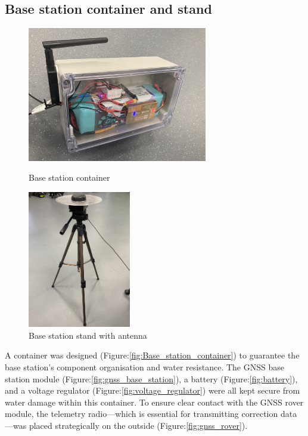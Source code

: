 \documentclass{report}
\begin{document}
\subsection{Base station container and stand}
\begin{figure}[H]
  \begin{minipage}{.5\textwidth}
    \centering
    \includegraphics[width=0.7\textwidth]{Pictures/base_station_box.png}
    \caption{Base station container}
    \label{fig:Base_station_container}
  \end{minipage}
  \begin{minipage}{.5\textwidth}
    \centering
    \includegraphics[width=0.4\textwidth]{Pictures/base_station_stand.jpg}
    \caption{Base station stand with antenna}
    \label{fig:Base_station_stand}
  \end{minipage}
\end{figure}
A container was designed (Figure:\ref{fig:Base_station_container}) to guarantee
the base station's component organisation and water resistance. The GNSS base
station module (Figure:\ref{fig:gnss_base_station}), a battery
(Figure:\ref{fig:battery}), and a voltage regulator
(Figure:\ref{fig:voltage_regulator}) were all kept secure from water damage
within this container. To ensure clear contact with the GNSS rover module, the
telemetry radio—which is essential for transmitting correction data—was placed
strategically on the outside (Figure:\ref{fig:gnss_rover}).
\end{document}
